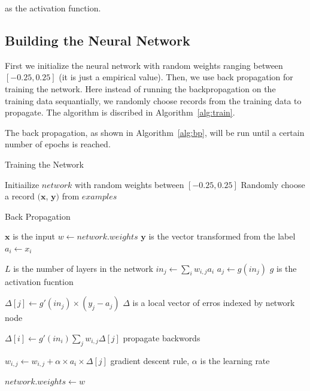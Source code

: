\documentclass{article}
\begin{document}
as the activation function.

\subsection{Building the Neural Network}

First we initialize the neural network with random weights ranging between $[-0.25, 0.25]$ (it is just a empirical value). Then, we use back propagation for training the network. Here instead of running the backpropagation on the training data sequantially, we randomly choose records from the training data to propagate. The algorithm is discribed in Algorithm~\ref{alg:train}.

The back propagation, as shown in Algorithm~\ref{alg:bp}, will be run until a certain number of epochs is reached.

\begin{algorithm}[H]
\centering
\caption{Training the Network}
\label{alg:train}
  \begin{algorithmic}[1]
    	\State Initiailize $network$ with random weights between $[-0.25, 0.25]$
   	    	\State Randomly choose a record $(\mathbf{x}$, $\mathbf{y})$ from $examples$
   	    	\State {}
    	\EndFor
    \EndFunction
  \end{algorithmic}
\end{algorithm}

\begin{algorithm}[H]
\centering
\caption{Back Propagation}
\label{alg:bp}
  \begin{algorithmic}[1]
    	\Comment $\mathbf{x}$ is the input
    	\State $w \gets network.weights$ \Comment $\mathbf{y}$ is the vector transformed from the label
    		\State $a_i \gets x_i$
    	\EndFor
    	
    	  \Comment $L$ is the number of layers in the network
    			\State $in_j \gets \sum_i w_{i,j}a_i$
    			\State $a_j \gets g(in_j)$  \Comment $g$ is the activation fucntion
    		\EndFor
    	\EndFor

			\State $\Delta[j] \gets g'(in_j) \times (y_j - a_j)$
			\Comment $\Delta$ is a local vector of erros indexed by network node
		\EndFor
		
				\State $\Delta[i] \gets g'(in_i) \sum_j w_{i,j}\Delta[j]$
				\Comment propagate backwords
			\EndFor
		\EndFor
		
			\State $w_{i,j} \gets w_{i,j} + \alpha \times a_i \times \Delta[j]$  \Comment gradient descent rule, $\alpha$ is the learning rate
		\EndFor
		
		\State $network.weights \gets w$
    \EndFunction
  \end{algorithmic}
\end{algorithm}
\end{document}
